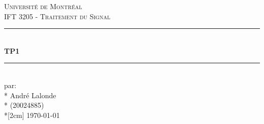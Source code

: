 \documentclass[11pt, letterpaper]{article}
\begin{document}
\begin{titlepage}
	\center
	
	\vspace*{2cm}
	
	\textsc{\LARGE Université de Montréal}\\[1cm] 
	\textsc{\Large IFT 3205 - Traitement du Signal}\\[1.5cm] 
	
	\rule{\linewidth}{0.5mm} \\[0.5cm]
	{\LARGE \bfseries TP1} \\[0.2cm] %
	\rule{\linewidth}{0.5mm} \\[3cm]
	
	\large par: \\*
	André Lalonde \\*
	(20024885) \\*[2cm]
	{\large \today}\\[3cm]
	
	\vfill
\end{titlepage}
\newpage
\flushleft
\end{document}

